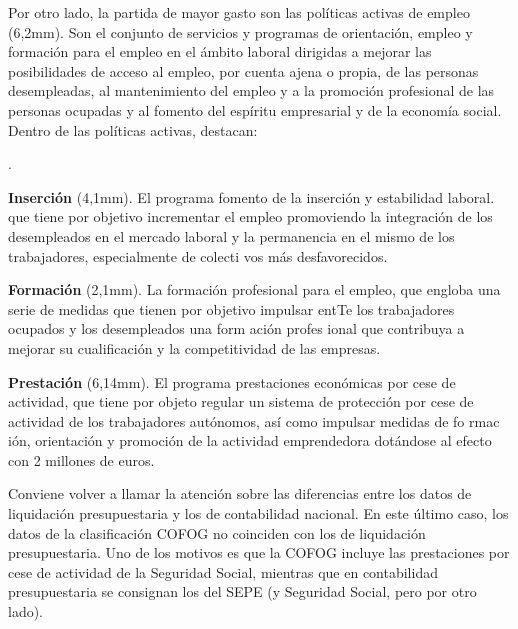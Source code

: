 \documentclass[10pt,a4paper]{article}
\newcounter{numitem}
\newenvironment{lnum}
      {\begin{list}{\arabic{numitem}.}{%
          \usecounter{numitem}%
          \setlength{\leftmargin}{1cm}%
          \setlength{\parskip}{3pt}%
          \setlength{\itemsep}{0pt}%
          \setlength{\parsep}{0pt}%
      }}
      {\end{list}}
\begin{document}
Por otro lado, la partida de mayor gasto son las políticas activas de empleo (6,2mm). Son el conjunto de servicios y programas de orientación, empleo y formación para el empleo en el ámbito laboral dirigidas a mejorar las posibilidades de acceso al empleo, por cuenta ajena o propia, de las personas desempleadas, al mantenimiento del empleo y a la promoción profesional de las personas ocupadas y al fomento del espíritu empresarial y de la economía social. Dentro de las políticas activas, destacan: 
\begin{lnum}
    \item \textbf{Inserción} (4,1mm). El programa fomento de la inserción y estabilidad laboral. que tiene por objetivo incrementar el empleo promoviendo la integración de los desempleados en el mercado laboral y la permanencia en el mismo de los trabajadores, especialmente de colecti vos más desfavorecidos.
    \item \textbf{Formación} (2,1mm). La formación profesional para el empleo, que engloba una serie de medidas que tienen por objetivo impulsar entTe los trabajadores ocupados y los desempleados una form ación profes ional que contribuya a mejorar su cualificación y la competitividad de las empresas.
    \item \textbf{Prestación} (6,14mm). El programa prestaciones económicas por cese de actividad, que tiene por objeto regular un sistema de protección por cese de actividad de los trabajadores autónomos, así como impulsar medidas de fo rmac ión, orientación y promoción de la actividad emprendedora dotándose al efecto con 2 millones de euros.
\end{lnum}

Conviene volver a llamar la atención sobre las diferencias entre los datos de liquidación presupuestaria y los de contabilidad nacional. En este último caso, los datos de la clasificación COFOG no coinciden con los de liquidación presupuestaria. Uno de los motivos es que la COFOG incluye las prestaciones por cese de actividad de la Seguridad Social, mientras que en contabilidad presupuestaria se consignan los del SEPE (y Seguridad Social, pero por otro lado).
\end{document}
